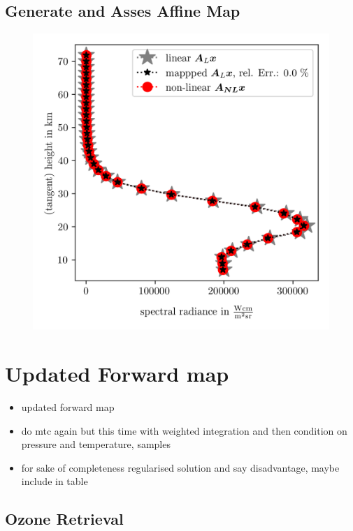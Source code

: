 \subsection{Generate and Asses Affine Map}
\begin{figure}[ht!]
	\centering
	\includegraphics{SampMapAssesment.png}
	\caption[]{}
	\label{fig:}
\end{figure}


\section{Updated Forward map}

\begin{itemize}
	\item updated forward map
	\item do mtc again but this time with weighted integration and then condition on pressure and temperature, samples
	\item for sake of completeness regularised solution and say disadvantage, maybe include in table
\end{itemize}


\subsection{Ozone Retrieval}

